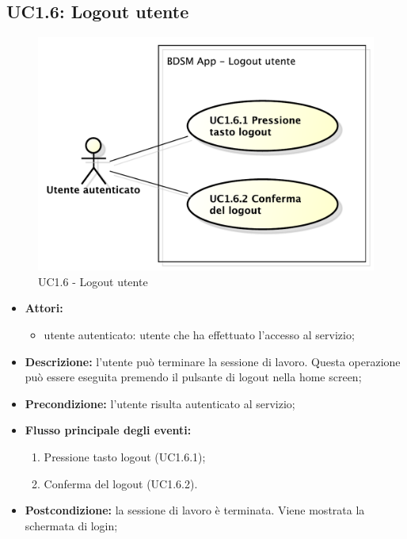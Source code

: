 \pagebreak


\subsection{UC1.6: Logout utente}
\begin{figure}[htbp]
	\centering
	\centerline{\includegraphics[scale=0.45]{./images/UC1_6.pdf}}
	\caption{UC1.6 - Logout utente}
\end{figure}

\begin{itemize}
	\item \textbf{Attori:}
	\begin{itemize}
		\item utente autenticato: utente che ha effettuato l'accesso al servizio;
	\end{itemize}
	\item \textbf{Descrizione:} l'utente può terminare la sessione di lavoro. Questa operazione può essere eseguita premendo il pulsante di logout nella home screen;
	\item \textbf{Precondizione:} l'utente risulta autenticato al servizio;
	\item \textbf{Flusso principale degli eventi:}
	\begin{enumerate}
		\item Pressione tasto logout (UC1.6.1);
		\item Conferma del logout (UC1.6.2).
	\end{enumerate}
	\item \textbf{Postcondizione:} la sessione di lavoro è terminata. Viene mostrata la schermata di login;
\end{itemize}

